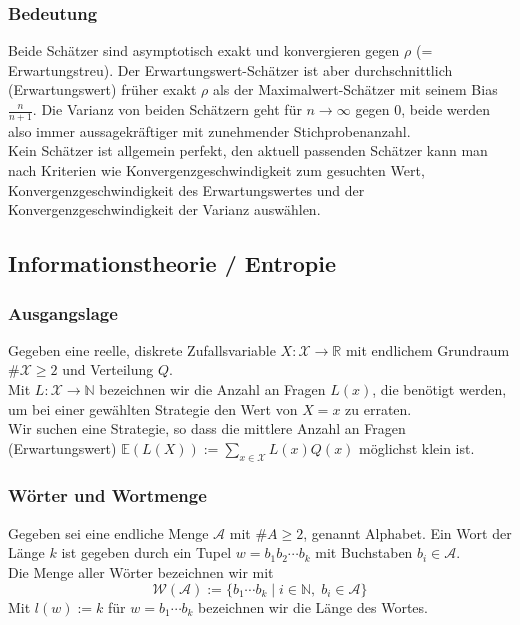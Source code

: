 \documentclass[a4paper]{article}
\begin{document}
\subsubsection{Bedeutung}
Beide Schätzer sind asymptotisch exakt und konvergieren gegen $\rho$ (= Erwartungstreu). Der Erwartungswert-Schätzer ist aber durchschnittlich (Erwartungswert) früher exakt $\rho$ als der Maximalwert-Schätzer mit seinem Bias $\frac{n}{n+1}$. Die Varianz von beiden Schätzern geht für $n \to \infty$ gegen 0, beide werden also immer aussagekräftiger mit zunehmender Stichprobenanzahl.\\
Kein Schätzer ist allgemein perfekt, den aktuell passenden Schätzer kann man nach Kriterien wie Konvergenzgeschwindigkeit zum gesuchten Wert, Konvergenzgeschwindigkeit des Erwartungswertes und der Konvergenzgeschwindigkeit der Varianz auswählen.

\pagebreak
\subsection{Informationstheorie / Entropie}

\subsubsection{Ausgangslage}
Gegeben eine reelle, diskrete Zufallsvariable $X :\mathcal{X} \to \mathbb{R}$ mit endlichem Grundraum $\#\mathcal{X}  \geq 2$ und Verteilung $Q$.\\
Mit $L : \mathcal{X} \to \mathbb{N}$ bezeichnen wir die Anzahl an Fragen $L(x)$, die benötigt werden, um bei einer gewählten Strategie den Wert von $X = x$ zu erraten.\\
Wir suchen eine Strategie, so dass die mittlere Anzahl an Fragen  (Erwartungswert) $\mathbb{E}(L(X)) := \sum_{x \in \mathcal{X}} L(x) Q(x)$  möglichst klein ist.

\subsubsection{Wörter und Wortmenge}
Gegeben sei eine endliche Menge $\mathcal{A}$ mit $\# A \geq 2$, genannt Alphabet.
Ein Wort der Länge $k$ ist gegeben durch ein Tupel $w = b_1b_2 \cdots b_k$ mit Buchstaben $b_i \in \mathcal {A}$.\\
Die Menge aller Wörter bezeichnen wir mit 
$$\mathcal{W} (\mathcal{A}) := \{  b_1 \cdots b_k \; | \; i \in \mathbb{N}, \; b_i \in \mathcal{A} \} $$
 Mit $l(w):= k$ für $w=b_1 \cdots b_k  $ bezeichnen wir die Länge des Wortes.
 
\end{document}
